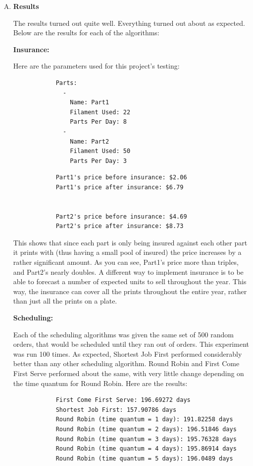 \documentclass[11pt]{article}
\begin{document}
\begin{enumerate}[A. ]
    \item \textbf{Results}

        The results turned out quite well. Everything turned out about as expected. Below are the results for each of the algorithms:

        \textbf{Insurance:}

        Here are the parameters used for this project's testing:

        \begin{lstlisting}
            Parts:
              -
                Name: Part1
                Filament Used: 22
                Parts Per Day: 8
              -
                Name: Part2
                Filament Used: 50
                Parts Per Day: 3
        \end{lstlisting}

        \begin{lstlisting}
            Part1's price before insurance: $2.06
            Part1's price after insurance: $6.79


            Part2's price before insurance: $4.69
            Part2's price after insurance: $8.73
        \end{lstlisting}

        This shows that since each part is only being insured against each other part it prints with (thus having a small pool of insured) the price increases by a rather
        significant amount. As you can see, Part1's price more than triples, and Part2's nearly doubles. A different way to implement insurance is to be able to forecast
        a number of expected units to sell throughout the year. This way, the insurance can cover all the prints throughout the entire year, rather than just all the
        prints on a plate.

        \bigbreak

        \textbf{Scheduling:}

        Each of the scheduling algorithms was given the same set of 500 random orders, that would be scheduled until they ran out of orders. This experiment was run 100 times.
        As expected, Shortest Job First performed considerably better than any other scheduling algorithm. Round Robin and First Come First Serve performed about the same, with
        very little change depending on the time quantum for Round Robin. Here are the results:

        \begin{lstlisting}
            First Come First Serve: 196.69272 days
            Shortest Job First: 157.90786 days
            Round Robin (time quantum = 1 day): 191.82258 days
            Round Robin (time quantum = 2 days): 196.51846 days
            Round Robin (time quantum = 3 days): 195.76328 days
            Round Robin (time quantum = 4 days): 195.86914 days
            Round Robin (time quantum = 5 days): 196.0489 days
        \end{lstlisting}


\end{enumerate}
\end{document}
